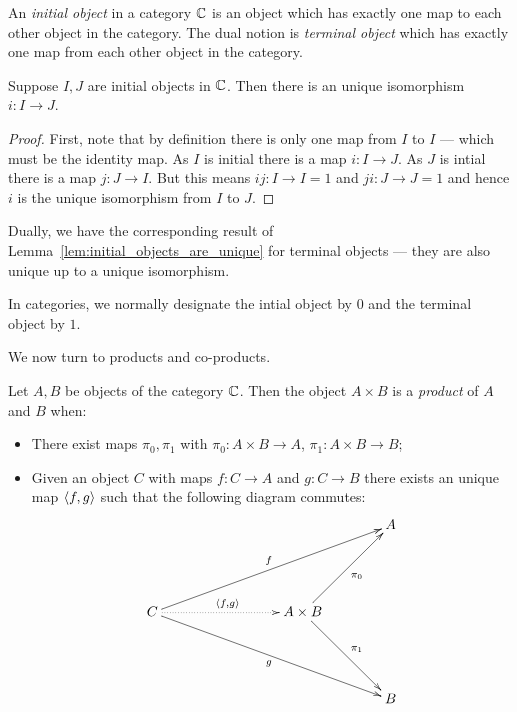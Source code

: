 \begin{definition}\label{def:initial_object}
  An \emph{initial object} in a category $\mathbb{C}$ is an object which has exactly one map to each other
  object in the category. The dual notion is \emph{terminal object} which has exactly one map from
  each other object in the category.
\end{definition}


\begin{lemma}\label{lem:initial_objects_are_unique}
  Suppose $I,J$ are initial objects in $\mathbb{C}$. Then there is an unique isomorphism $i:I \to J$.
\end{lemma}
\begin{proof}
  First, note that by definition there is only one map from $I$ to $I$ --- which must be the
  identity map. As $I$ is initial there is a map $i: I \to J$. As $J$ is intial there is a map
  $j:J \to I$. But this means $ij : I \to I = 1$ and $j i : J \to J = 1$ and hence $i$ is the
  unique isomorphism from $I$ to $J$.
\end{proof}

Dually, we have the corresponding result of Lemma~\ref{lem:initial_objects_are_unique} for terminal
objects --- they are also unique up to a unique isomorphism.

In categories, we normally designate the intial object by $0$ and the terminal object by $1$.

We now turn to products and co-products.

\begin{definition}\label{def:categorical_product}
  Let $A,B$ be objects of the category $\mathbb{C}$. Then the object $A \times B$ is a \emph{product} of
  $A$ and $B$ when:
  \begin{itemize}
    \item There exist maps $\pi_0, \pi_1$ with $\pi_0:A\times B \to A$, $\pi_1:A\times B \to B$;
    \item Given an object $C$ with maps $f:C\to A$ and $g:C \to B$ there exists an unique map
    $\langle f,g\rangle$ such that the following diagram commutes:
    \[
      \xymatrix@C+15pt@R+25pt{
        &&&A\\
        C\ar[urrr]^{f} \ar[drrr]_{g}\ar@{.>}[rr]^{\<f,g\>} & &A\times B \ar[ur]_{\pi_0}\ar[dr]^{\pi_1}\\
        &&&B
      }
    \]
  \end{itemize}

\end{definition}

